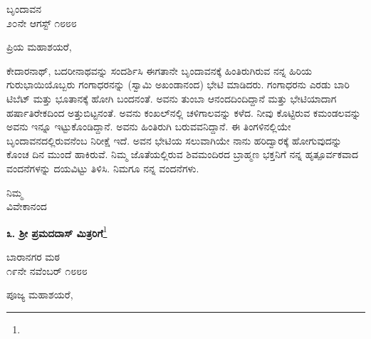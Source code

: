 \vspace{-0.5cm}

\begin{flushright}
ಬೃಂದಾವನ\\೨೦ನೇ ಆಗಸ್ಟ್ ೧೮೮೮
\end{flushright}

\noindent
ಪ್ರಿಯ ಮಹಾಶಯರೆ,

ಕೇದಾರನಾಥ್, ಬದರೀನಾಥವನ್ನು ಸಂದರ್ಶಿಸಿ ಈಗತಾನೇ ಬೃಂದಾವನಕ್ಕೆ ಹಿಂತಿರುಗಿರುವ ನನ್ನ ಹಿರಿಯ ಗುರುಭಾಯಿಯೊಬ್ಬರು ಗಂಗಾಧರನನ್ನು (ಸ್ವಾಮಿ ಅಖಂಡಾನಂದ) ಭೇಟಿ ಮಾಡಿದರು. ಗಂಗಾಧರನು ಎರಡು ಬಾರಿ ಟಿಬೆಟ್ ಮತ್ತು ಭೂತಾನಕ್ಕೆ ಹೋಗಿ ಬಂದನಂತೆ. ಅವನು ತುಂಬಾ ಆನಂದದಿಂದಿದ್ದಾನೆ ಮತ್ತು ಭೇಟಿಯಾದಾಗ ಹರ್ಷಾತಿ\break  ರೇಕದಿಂದ ಅತ್ತುಬಿಟ್ಟನಂತೆ. ಅವನು ಕಂಖಲ್‌ನಲ್ಲಿ ಚಳಿಗಾಲವನ್ನು ಕಳೆದ. ನೀವು ಕೊಟ್ಟಿರುವ ಕಮಂಡಲವನ್ನು ಅವನು ಇನ್ನೂ ಇಟ್ಟುಕೊಂಡಿದ್ದಾನೆ. ಅವನು ಹಿಂತಿರುಗಿ ಬರುವವನಿದ್ದಾನೆ. ಈ ತಿಂಗಳಿನಲ್ಲಿಯೇ ಬೃಂದಾವನದಲ್ಲಿರುವನೆಂಬ ನಿರೀಕ್ಷೆ ಇದೆ. ಅವನ ಭೇಟಿಯ ಸಲುವಾಗಿಯೇ ನಾನು ಹರಿದ್ವಾರಕ್ಕೆ ಹೋಗುವುದನ್ನು ಕೊಂಚ ದಿನ ಮುಂದೆ ಹಾಕಿರುವೆ. ನಿಮ್ಮ ಜೊತೆಯಲ್ಲಿರುವ ಶಿವಮಂದಿರದ ಬ್ರಾಹ್ಮಣ ಭಕ್ತನಿಗೆ ನನ್ನ ಹೃತ್ಪೂರ್ವಕವಾದ ವಂದನೆಗಳನ್ನು ದಯವಿಟ್ಟು ತಿಳಿಸಿ. ನಿಮಗೂ ನನ್ನ ವಂದನೆಗಳು.

\vspace{-0.5cm}

\begin{flushright}
ನಿಮ್ಮ\\ವಿವೇಕಾನಂದ
\end{flushright}

\vspace{-0.5cm}

\begin{center}
\textbf{೩. ಶ‍್ರೀ ಪ್ರಮದದಾಸ್ ಮಿತ್ರರಿಗೆ}\footnote{}\\  {\fontsize{11pt}{11pt}\selectfont{ಶ‍್ರೀ ರಾಮಕೃಷ್ಣರಿಗೆ ಅನಂತಾನಂತ ಪ್ರಣಾಮಗಳು.}}
\end{center}

\vspace{-0.5cm}

\begin{flushright}
ಬಾರಾನಗರ ಮಠ\\೧೯ನೇ ನವೆಂಬರ್ ೧೮೮೮
\end{flushright}
\vspace{-0.5cm}

\noindent
ಪೂಜ್ಯ ಮಹಾಶಯರೆ,

